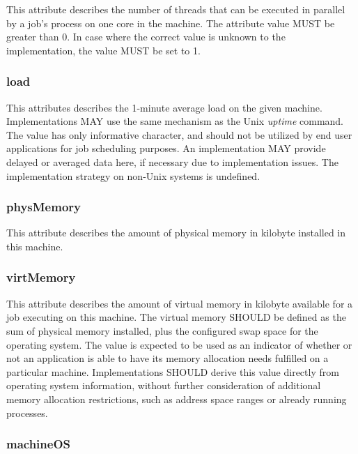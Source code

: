 \documentclass{article}
\newcommand{\rat}[1]{}
\begin{document}
This attribute describes the number of threads that can be executed in parallel by a job's process on one core in the machine. The attribute value MUST be greater than 0. In case where the correct value is unknown to the implementation, the value MUST be set to 1.

\subsubsection{load}

This attributes describes the 1-minute average load on the given machine. Implementations MAY use the same mechanism as the Unix \emph{uptime} command. The value has only informative character, and should not be utilized by end user applications for job scheduling purposes. An implementation MAY provide delayed or averaged data here, if necessary due to implementation issues. The implementation strategy on non-Unix systems is undefined.

\rat{In July 2011, there was a short debate on the list if this value should be normalized by the library to $<0,1>$. It was rejected, since DRMAA should just forward given information from the DRM / OS, for which the maximum value is typically not known. }

\subsubsection{physMemory}

This attribute describes the amount of physical memory in kilobyte installed in this machine.

\subsubsection{virtMemory}

This attribute describes the amount of virtual memory in kilobyte available for a job executing on this machine. The virtual memory SHOULD be defined as the sum of physical memory installed, plus the configured swap space for the operating system. The value is expected to be used as an indicator of whether or not an application is able to have its memory allocation needs fulfilled on a particular machine. Implementations SHOULD derive this value directly from operating system information, without further consideration of additional memory allocation restrictions, such as address space ranges or already running processes.

\subsubsection{machineOS}
\end{document}
